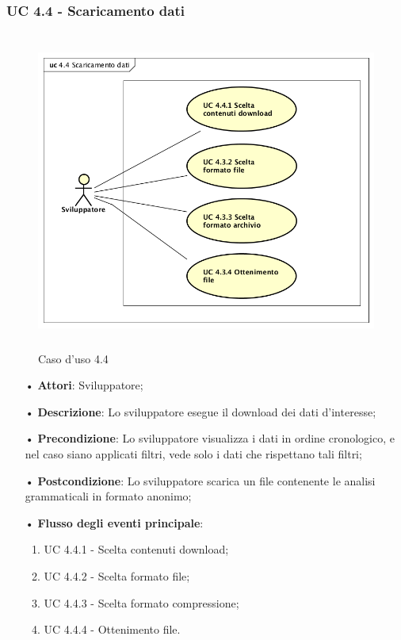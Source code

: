\subsubsection{UC 4.4 - Scaricamento dati}
\begin{figure}[H]
\centering
\includegraphics[width=17cm, height=10.5cm]{img/UC440.png} 
\caption{Caso d'uso 4.4}\label{fig:440}
\end{figure}
\begin{itemize}
\item[•]\textbf{Attori}: Sviluppatore;
\item[•]\textbf{Descrizione}: Lo sviluppatore esegue il download dei dati d'interesse;
\item[•]\textbf{Precondizione}: Lo sviluppatore visualizza i dati in ordine cronologico, e nel caso siano applicati filtri, vede solo i dati che rispettano tali filtri;
\item[•]\textbf{Postcondizione}:  Lo sviluppatore scarica un file contenente le analisi grammaticali in formato anonimo;
\item[•]\textbf{Flusso degli eventi principale}:
\begin{enumerate}
\item UC 4.4.1 - Scelta contenuti download;
\item UC 4.4.2 - Scelta formato file;
\item UC 4.4.3 - Scelta formato compressione;
\item UC 4.4.4 - Ottenimento file.
\end{enumerate}
\end{itemize}

